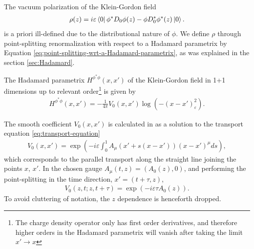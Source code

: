 		The vacuum polarization of the Klein-Gordon field
		\begin{align}
			\rho(z) = i\varepsilon \bra{0} \phi^* D_0\phi(z) - \phi D_0^* \phi^*(z) \ket{0}.
			\label{eq:vacuum-polarization}
		\end{align}
        is a priori ill-defined due to the distributional nature of $\phi$.
        We define $\rho$ through point-splitting renormalization with respect to a Hadamard parametrix by Equation \eqref{eq:point-splitting-wrt-a-Hadamard-parametrix}, as was explained in the section \ref{sec:Hadamard}.
        
		The Hadamard parametrix $H^{\phi^*\phi}(x, x') $ of the Klein-Gordon field in 1+1 dimensions up to relevant order\footnote{The charge density operator only has first order derivatives, and therefore higher orders in the Hadamard parametrix will vanish after taking the limit $x'\to x$ }
        is given by
		\begin{align}
			H^{\phi^* \phi}(x, x') = -\frac{1}{4\pi}V_0(x, x') \log (-(x-x')^2_\varepsilon).
		\end{align}

	The smooth coefficient $V_0(x, x')$  is calculated in \cite{Schl2015} as a solution to the transport equation \eqref{eq:transport-equation}
	\begin{align}
		V_0(x, x') = \exp \left( -i\varepsilon \int_{0}^{1} A_\mu(x' + s(x-x')) \left( x- x' \right) ^{ \mu} ds  \right),
	\end{align}
    which corresponds to the parallel transport along the straight line joining the points $x$, $x'$.
	In the chosen gauge $A_\mu(t, z) = (A_0(z), 0)$, and performing the point-splitting in the time direction, $x' =  (t+\tau, z)$, 
	\begin{align}
	V_0(z, t; z,t+\tau ) = \exp\left( -i\varepsilon\tau A_0(z) \right).
	\end{align}
    To avoid cluttering of notation, the $z$ dependence is henceforth dropped.

